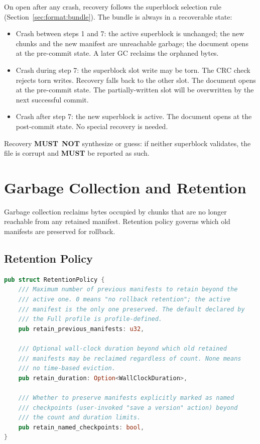 \documentclass[11pt,letterpaper]{report}
\newcounter{requirement}[chapter]
\newcommand{\MUST}{\textbf{MUST}}
\newcommand{\MUSTNOT}{\textbf{MUST}\nobreak\ \textbf{NOT}}
\begin{document}
\begin{requirement}
  \label{req:format:crash-recovery}
  On open after any crash, recovery follows the superblock
  selection rule (Section~\ref{sec:format:bundle}). The bundle is
  always in a recoverable state:

  \begin{itemize}
    \item Crash between steps 1 and 7: the active superblock is
      unchanged; the new chunks and the new manifest are
      unreachable garbage; the document opens at the pre-commit
      state. A later GC reclaims the orphaned bytes.
    \item Crash during step 7: the superblock slot write may be
      torn. The CRC check rejects torn writes. Recovery falls back
      to the other slot. The document opens at the pre-commit
      state. The partially-written slot will be overwritten by the
      next successful commit.
    \item Crash after step 7: the new superblock is active. The
      document opens at the post-commit state. No special
      recovery is needed.
  \end{itemize}

  Recovery \MUSTNOT{} synthesize or guess: if neither superblock
  validates, the file is corrupt and \MUST{} be reported as such.
\end{requirement}

\section{Garbage Collection and Retention}
\label{sec:format:gc}

Garbage collection reclaims bytes occupied by chunks that are no
longer reachable from any retained manifest. Retention policy
governs which old manifests are preserved for rollback.

\subsection{Retention Policy}

\begin{lstlisting}[language=Rust]
pub struct RetentionPolicy {
    /// Maximum number of previous manifests to retain beyond the
    /// active one. 0 means "no rollback retention"; the active
    /// manifest is the only one preserved. The default declared by
    /// the Full profile is profile-defined.
    pub retain_previous_manifests: u32,

    /// Optional wall-clock duration beyond which old retained
    /// manifests may be reclaimed regardless of count. None means
    /// no time-based eviction.
    pub retain_duration: Option<WallClockDuration>,

    /// Whether to preserve manifests explicitly marked as named
    /// checkpoints (user-invoked "save a version" action) beyond
    /// the count and duration limits.
    pub retain_named_checkpoints: bool,
}
\end{lstlisting}
\end{document}
